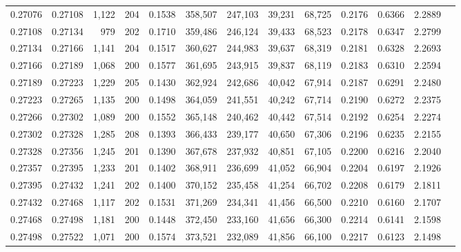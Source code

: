 \begin{tabular}{rrrrrrrrrrrrr}
0.27076 & 0.27108 & 1,122 & 204 &                                     0.1538 & 358,507 & 247,103 &  39,231 &  68,725 & 0.2176 & 0.6366 & 2.2889 \\
0.27108 & 0.27134 &   979 & 202 &                                     0.1710 & 359,486 & 246,124 &  39,433 &  68,523 & 0.2178 & 0.6347 & 2.2799 \\
0.27134 & 0.27166 & 1,141 & 204 &                                     0.1517 & 360,627 & 244,983 &  39,637 &  68,319 & 0.2181 & 0.6328 & 2.2693 \\
0.27166 & 0.27189 & 1,068 & 200 &                                     0.1577 & 361,695 & 243,915 &  39,837 &  68,119 & 0.2183 & 0.6310 & 2.2594 \\
0.27189 & 0.27223 & 1,229 & 205 &                                     0.1430 & 362,924 & 242,686 &  40,042 &  67,914 & 0.2187 & 0.6291 & 2.2480 \\
0.27223 & 0.27265 & 1,135 & 200 &                                     0.1498 & 364,059 & 241,551 &  40,242 &  67,714 & 0.2190 & 0.6272 & 2.2375 \\
0.27266 & 0.27302 & 1,089 & 200 &                                     0.1552 & 365,148 & 240,462 &  40,442 &  67,514 & 0.2192 & 0.6254 & 2.2274 \\
0.27302 & 0.27328 & 1,285 & 208 &                                     0.1393 & 366,433 & 239,177 &  40,650 &  67,306 & 0.2196 & 0.6235 & 2.2155 \\
0.27328 & 0.27356 & 1,245 & 201 &                                     0.1390 & 367,678 & 237,932 &  40,851 &  67,105 & 0.2200 & 0.6216 & 2.2040 \\
0.27357 & 0.27395 & 1,233 & 201 &                                     0.1402 & 368,911 & 236,699 &  41,052 &  66,904 & 0.2204 & 0.6197 & 2.1926 \\
0.27395 & 0.27432 & 1,241 & 202 &                                     0.1400 & 370,152 & 235,458 &  41,254 &  66,702 & 0.2208 & 0.6179 & 2.1811 \\
0.27432 & 0.27468 & 1,117 & 202 &                                     0.1531 & 371,269 & 234,341 &  41,456 &  66,500 & 0.2210 & 0.6160 & 2.1707 \\
0.27468 & 0.27498 & 1,181 & 200 &                                     0.1448 & 372,450 & 233,160 &  41,656 &  66,300 & 0.2214 & 0.6141 & 2.1598 \\
0.27498 & 0.27522 & 1,071 & 200 &                                     0.1574 & 373,521 & 232,089 &  41,856 &  66,100 & 0.2217 & 0.6123 & 2.1498 \\

\end{tabular}
